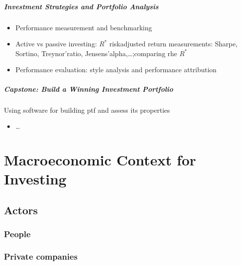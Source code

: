 \documentclass[letterpaper,10pt,english]{jupyterBook}
\begin{document}
\subsubsection*{Investment Strategies and Portfolio Analysis}
\begin{itemize}
\item {} 
\sphinxAtStartPar
Performance measurement and benchmarking

\item {} 
\sphinxAtStartPar
Active vs passive investing: \(R^*\) risk\sphinxhyphen{}adjusted return measurements: Sharpe, Sortino, Treynor’ratio, Jensens’alpha,…;comparing rhe \(R^*\)

\item {} 
\sphinxAtStartPar
Performance evaluation: style analysis and performance attribution

\end{itemize}
\subsubsection*{Capstone: Build a Winning Investment Portfolio}

\sphinxAtStartPar
Using software for building ptf and assess its properties
\begin{itemize}
\item {} 
\sphinxAtStartPar
…

\end{itemize}

\sphinxstepscope


\part{Macroeconomic Context for Investing}

\sphinxstepscope


\chapter{Actors}
\label{\detokenize{ch/actors:actors}}\label{\detokenize{ch/actors:fin-edu-actors}}\label{\detokenize{ch/actors::doc}}

\section{People}
\label{\detokenize{ch/actors:people}}\label{\detokenize{ch/actors:fin-edu-actors-people}}

\section{Private companies}
\label{\detokenize{ch/actors:private-companies}}\label{\detokenize{ch/actors:fin-edu-actors-firms}}
\end{document}
